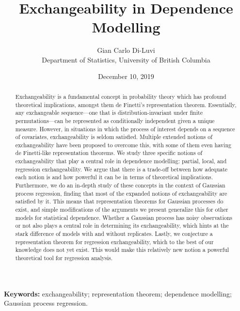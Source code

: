\documentclass[10pt]{article}
\title{Exchangeability in Dependence Modelling} %
\author{Gian Carlo Di-Luvi 
\\
{\normalsize Department of Statistics, University of British Columbia}} %
\date{\normalsize December 10, 2019} %
\begin{document}
\maketitle
\thispagestyle{empty}

\vskip 0.5cm

\begin{abstract}
\noindent Exchangeability is a fundamental concept in probability theory which has profound theoretical implications, amongst them de Finetti's representation theorem. Essentially, any exchangeable sequence---one that is distribution-invariant under finite permutations---can be represented as conditionally independent given a unique measure. However, in situations in which the process of interest depends on a sequence of covariates, exchangeability is seldom satisfied. Multiple extended notions of exchangeability have been proposed to overcome this, with some of them even having de Finetti-like representation theorems. We study three specific notions of exchangeability that play a central role in dependence modelling: partial, local, and regression exchangeability. We argue that there is a trade-off between how adequate each notion is and how powerful it can be in terms of theoretical implications. Furthermore, we do an in-depth study of these concepts in the context of Gaussian process regression, finding that most of the expanded notions of exchangeability are satisfied by it. This means that representation theorems for Gaussian processes do exist, and simple modifications of the arguments we present generalize this for other models for statistical dependence. Whether a Gaussian process has noisy observations or not also plays a central role in determining its exchangeability, which hints at the stark difference of models with and without replicates. Lastly, we conjecture a representation theorem for regression exchangeability, which to the best of our knowledge does not yet exist. This would make this relatively new notion a powerful theoretical tool for regression analysis.
\end{abstract}

\textbf{Keywords:} exchangeability; representation theorem; dependence modelling; Gaussian process regression.




\cleardoublepage
\setcounter{page}{1}


\vskip 2cm



\end{document}
